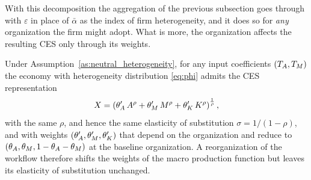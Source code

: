 With this decomposition the aggregation of the previous subsection goes through with $\varepsilon$ in place of $\bar{\alpha}$ as the index of firm heterogeneity, and it does so for \emph{any} organization the firm might adopt.
What is more, the organization affects the resulting CES only through its weights.

\begin{lem}
\label{lem:sigma_invariance}
Under Assumption~\ref{as:neutral_heterogeneity}, for any input coefficients $(T_{A}, T_{M})$ the economy with heterogeneity distribution \eqref{eq:phi} admits the CES representation
\begin{equation}
X = \left(\theta'_{A}\,A^{\rho}+\theta'_{M}\,M^{\rho}+\theta'_{K}\,K^\rho\right)^{\frac{1}{\rho}},
\label{eq:macro_agg_prod_general}
\end{equation}
with the same $\rho$, and hence the same elasticity of substitution $\sigma = 1/(1-\rho)$, and with weights $(\theta'_{A}, \theta'_{M}, \theta'_{K})$ that depend on the organization and reduce to $(\theta_{A}, \theta_{M}, 1-\theta_{A}-\theta_{M})$ at the baseline organization.
A reorganization of the workflow therefore shifts the weights of the macro production function but leaves its elasticity of substitution unchanged.
\end{lem}

